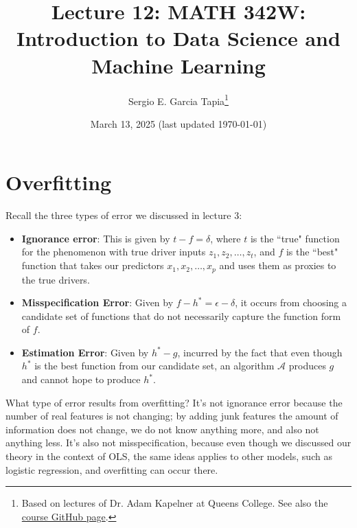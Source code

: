 \documentclass[12pt, a4paper]{article}
\title{Lecture 12: MATH 342W: Introduction to Data Science and Machine Learning}
\author{Sergio E. Garcia Tapia\thanks{Based on lectures of Dr. Adam Kapelner at Queens College.
See also the \href{https://github.com/kapelner/QC_MATH_342W_Spring_2025}{course GitHub page}.}}
\date{March 13, 2025 (last updated \today)}
\theoremstyle{definition}
\begin{document}
	\maketitle
	\section*{Overfitting}
	Recall the three types of error we discussed in lecture 3:
	\begin{itemize}
		\item \textbf{Ignorance error}: This is given by $t-f=\delta$, where $t$ is the ``true"
		function for the phenomenon with true driver inputs $z_1,z_2,\ldots,z_t$,
		and $f$ is the ``best" function that takes our predictors $x_1,x_2,\ldots,x_p$
		and uses them as proxies to the true drivers. 
		\item \textbf{Misspecification Error}: Given by $f-h^*=\epsilon-\delta$, it occurs
		from choosing a candidate set of functions that do not necessarily capture
		the function form of $f$.
		\item \textbf{Estimation Error}: Given by $h^*-g$, incurred by the fact that
		even though $h^*$ is the best function from our candidate set, an algorithm
		$\mathcal{A}$ produces $g$ and cannot hope to produce $h^*$.
	\end{itemize}
	What type of error results from overfitting? It's not ignorance error because
	the number of real features is not changing; by adding junk features the amount
	of information does not change, we do not know anything more, and also not
	anything less. It's also not misspecification, because even though we discussed
	our theory in the context of OLS, the same ideas applies to other models, such
	as logistic regression, and overfitting can occur there.
	
\end{document}
